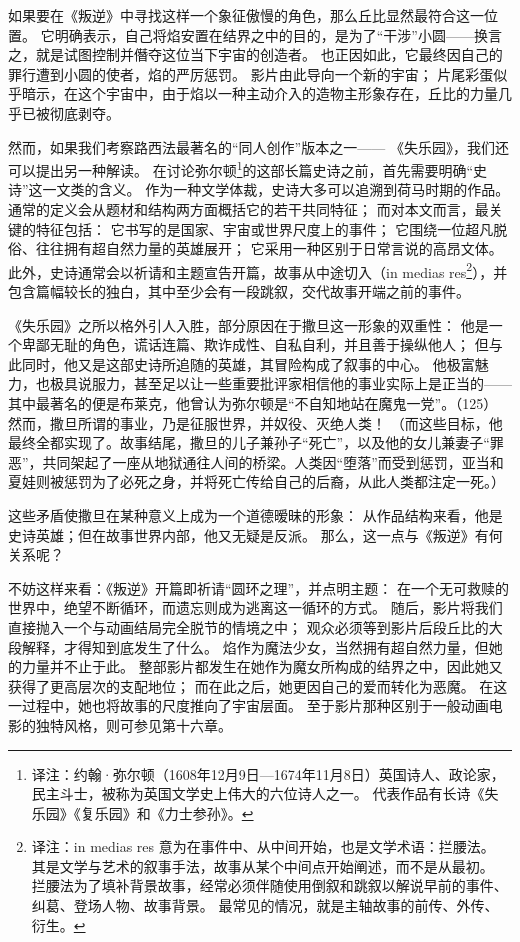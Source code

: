 如果要在《叛逆》中寻找这样一个象征傲慢的角色，那么丘比显然最符合这一位置。
它明确表示，自己将焰安置在结界之中的目的，是为了“干涉”小圆——换言之，就是试图控制并僭夺这位当下宇宙的创造者。
也正因如此，它最终因自己的罪行遭到小圆的使者，焰的严厉惩罚。
影片由此导向一个新的宇宙；
片尾彩蛋似乎暗示，在这个宇宙中，由于焰以一种主动介入的造物主形象存在，丘比的力量几乎已被彻底剥夺。


然而，如果我们考察路西法最著名的“同人创作”版本之一——
《失乐园》，我们还可以提出另一种解读。
在讨论弥尔顿\footnote{%
    译注：约翰·弥尔顿（1608年12月9日—1674年11月8日）英国诗人、政论家，民主斗士，被称为英国文学史上伟大的六位诗人之一。
    代表作品有长诗《失乐园》《复乐园》和《力士参孙》。
}的这部长篇史诗之前，首先需要明确“史诗”这一文类的含义。
作为一种文学体裁，史诗大多可以追溯到荷马时期的作品。
通常的定义会从题材和结构两方面概括它的若干共同特征；
而对本文而言，最关键的特征包括：
它书写的是国家、宇宙或世界尺度上的事件；
它围绕一位超凡脱俗、往往拥有超自然力量的英雄展开；
它采用一种区别于日常言说的高昂文体。
此外，史诗通常会以祈请和主题宣告开篇，故事从中途切入（in medias res\footnote{%
    译注：in medias res 意为在事件中、从中间开始，也是文学术语：拦腰法。
    其是文学与艺术的叙事手法，故事从某个中间点开始阐述，而不是从最初。
    拦腰法为了填补背景故事，经常必须伴随使用倒叙和跳叙以解说早前的事件、纠葛、登场人物、故事背景。
    最常见的情况，就是主轴故事的前传、外传、衍生。
}），并包含篇幅较长的独白，其中至少会有一段跳叙，交代故事开端之前的事件。

《失乐园》之所以格外引人入胜，部分原因在于撒旦这一形象的双重性：
他是一个卑鄙无耻的角色，谎话连篇、欺诈成性、自私自利，并且善于操纵他人；
但与此同时，他又是这部史诗所追随的英雄，其冒险构成了叙事的中心。
他极富魅力，也极具说服力，甚至足以让一些重要批评家相信他的事业实际上是正当的——
其中最著名的便是布莱克，他曾认为弥尔顿是“不自知地站在魔鬼一党”。（125）
然而，撒旦所谓的事业，乃是征服世界，并奴役、灭绝人类！
（而这些目标，他最终全都实现了。故事结尾，撒旦的儿子兼孙子“死亡”，以及他的女儿兼妻子“罪恶”，共同架起了一座从地狱通往人间的桥梁。人类因“堕落”而受到惩罚，亚当和夏娃则被惩罚为了必死之身，并将死亡传给自己的后裔，从此人类都注定一死。）

这些矛盾使撒旦在某种意义上成为一个道德暧昧的形象：
从作品结构来看，他是史诗英雄；但在故事世界内部，他又无疑是反派。
那么，这一点与《叛逆》有何关系呢？

不妨这样来看：《叛逆》开篇即祈请“圆环之理”，并点明主题：
在一个无可救赎的世界中，绝望不断循环，而遗忘则成为逃离这一循环的方式。
随后，影片将我们直接抛入一个与动画结局完全脱节的情境之中；
观众必须等到影片后段丘比的大段解释，才得知到底发生了什么。
焰作为魔法少女，当然拥有超自然力量，但她的力量并不止于此。
整部影片都发生在她作为魔女所构成的结界之中，因此她又获得了更高层次的支配地位；
而在此之后，她更因自己的爱而转化为恶魔。
在这一过程中，她也将故事的尺度推向了宇宙层面。
至于影片那种区别于一般动画电影的独特风格，则可参见第十六章。

